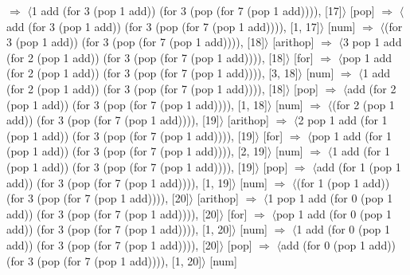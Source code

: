 \documentclass[12pt]{report}
\begin{document}
$\Rightarrow$ $\langle$1 add (for 3 (pop 1 add)) (for 3 (pop (for 7 (pop 1 add)))), [17]$\rangle$ \hfill [pop] \newline
$\Rightarrow$ $\langle$add (for 3 (pop 1 add)) (for 3 (pop (for 7 (pop 1 add)))), [1, 17]$\rangle$ \hfill [num] \newline
$\Rightarrow$ $\langle$(for 3 (pop 1 add)) (for 3 (pop (for 7 (pop 1 add)))), [18]$\rangle$ \hfill [arithop] \newline
$\Rightarrow$ $\langle$3 pop 1 add (for 2 (pop 1 add)) (for 3 (pop (for 7 (pop 1 add)))), [18]$\rangle$ \hfill [for] \newline
$\Rightarrow$ $\langle$pop 1 add (for 2 (pop 1 add)) (for 3 (pop (for 7 (pop 1 add)))), [3, 18]$\rangle$ \hfill [num] \newline
$\Rightarrow$ $\langle$1 add (for 2 (pop 1 add)) (for 3 (pop (for 7 (pop 1 add)))), [18]$\rangle$ \hfill [pop] \newline
$\Rightarrow$ $\langle$add (for 2 (pop 1 add)) (for 3 (pop (for 7 (pop 1 add)))), [1, 18]$\rangle$ \hfill [num] \newline
$\Rightarrow$ $\langle$(for 2 (pop 1 add)) (for 3 (pop (for 7 (pop 1 add)))), [19]$\rangle$ \hfill [arithop] \newline
$\Rightarrow$ $\langle$2 pop 1 add (for 1 (pop 1 add)) (for 3 (pop (for 7 (pop 1 add)))), [19]$\rangle$ \hfill [for] \newline
$\Rightarrow$ $\langle$pop 1 add (for 1 (pop 1 add)) (for 3 (pop (for 7 (pop 1 add)))), [2, 19]$\rangle$ \hfill [num] \newline
$\Rightarrow$ $\langle$1 add (for 1 (pop 1 add)) (for 3 (pop (for 7 (pop 1 add)))), [19]$\rangle$ \hfill [pop] \newline
$\Rightarrow$ $\langle$add (for 1 (pop 1 add)) (for 3 (pop (for 7 (pop 1 add)))), [1, 19]$\rangle$ \hfill [num] \newline
$\Rightarrow$ $\langle$(for 1 (pop 1 add)) (for 3 (pop (for 7 (pop 1 add)))), [20]$\rangle$ \hfill [arithop] \newline
$\Rightarrow$ $\langle$1 pop 1 add (for 0 (pop 1 add)) (for 3 (pop (for 7 (pop 1 add)))), [20]$\rangle$ \hfill [for] \newline
$\Rightarrow$ $\langle$pop 1 add (for 0 (pop 1 add)) (for 3 (pop (for 7 (pop 1 add)))), [1, 20]$\rangle$ \hfill [num] \newline
$\Rightarrow$ $\langle$1 add (for 0 (pop 1 add)) (for 3 (pop (for 7 (pop 1 add)))), [20]$\rangle$ \hfill [pop] \newline
$\Rightarrow$ $\langle$add (for 0 (pop 1 add)) (for 3 (pop (for 7 (pop 1 add)))), [1, 20]$\rangle$ \hfill [num] \newline
\end{document}
